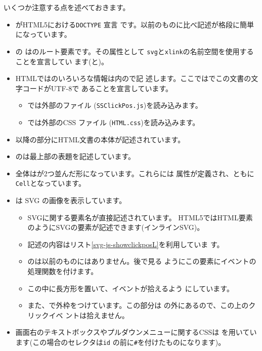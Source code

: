 いくつか注意する点を述べておきます。
\begin{itemize}
 \item {}がHTML5における\texttt{DOCTYPE} 宣言
です。以前のものに比べ記述が格段に簡単になっています。
 \item \HTML の は\HTML のルート要素です。その属性として
       \texttt{svg}と\texttt{xlink}の名前空間を使用することを宣言してい
       ます(と)。
  \item HTMLでは\HTML のいろいろな情報は内ので記
	述します。ここではでこの文書の文字コードがUTF-8で
        あることを宣言しています。
        \begin{itemize}
         \item {}では外部の\JS ファイル
               (\texttt{SSClickPos.js})を読み込みます。
         \item {}では外部のCSS ファイル
               (\texttt{HTML.css})を読み込みます。
        \end{itemize}
 \item {}以降の部分にHTML文書の本体が記述されています。
 \item {}のは最上部の表題を記述しています。
 \item 全体はが2つ並んだ形になっています。これらには
       属性が定義され、ともに\texttt{Cell}となっています。
 \item {}は SVG の画像を表示しています。
       \begin{itemize}
        \item SVGに関する要素名が直接記述されています。
              HTML5ではHTML要素のようにSVGの要素が記述できます(インラインSVG)。
        \item 記述の内容はリスト\ref{svg-js-showclickposL}を利用していま
              す。
        \item {}のは以前のものにはありません。後で見る
              ようにこの要素にイベントの処理関数を付けます。
        \item この中に長方形を置いて、イベントが拾えるよう
              にしています。
        \item また、で外枠をつけています。この部分は
              の外にあるので、この上のクリックイベ
              ントは拾えません。
       \end{itemize}
 \item 画面右のテキストボックスやプルダウンメニューに関するCSSは
       を用いています(この場合の{セレクタ}は\texttt{id}
       の前に\texttt{\#}を付けたものになります)。
\end{itemize}
